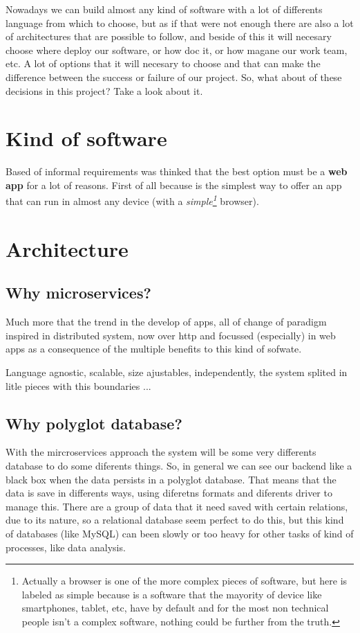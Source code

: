 \documentclass[oneside,english,titlepage]{scrbook}
\begin{document}
Nowadays we can build almost any kind of software with a lot of differents
language from which to choose, but as if that were not enough there
are also a lot of architectures that are possible to follow, and beside
of this it will necesary choose where deploy our software, or how
doc it, or how magane our work team, etc. A lot of options that it
will necesary to choose and that can make the difference between the
success or failure of our project. So, what about of these decisions
in this project? Take a look about it.

\section{Kind of software}
Based of informal requirements was thinked that the best option must be a \textbf{web app} for a lot of reasons. First of all because is the simplest way to offer an app that can run in almost any device (with a \textit{simple\footnote{Actually a browser is one of the more complex pieces of software, but here is labeled as simple because is a software that the mayority of device like smartphones, tablet, etc, have by default and for the most non technical people isn't a complex software, nothing could be further from the truth.}} browser). 

\section{Architecture}

\subsection{Why microservices?}

Much more that the trend in the develop of apps, all of change of
paradigm inspired in distributed system, now over http and focussed
(especially) in web apps as a consequence of the multiple benefits
to this kind of sofwate. \bigskip

Language agnostic, scalable, size ajustables, independently, the system
splited in litle pieces with this boundaries ...

\subsection{Why polyglot database?}

With the mircroservices approach the system will be some very differents
database to do some diferents things. So, in general we can see our
backend like a black box when the data persists in a polyglot database.
That means that the data is save in differents ways, using diferetns
formats and diferents driver to manage this. There are a group of
data that it need saved with certain relations, due to its nature,
so a relational database seem perfect to do this, but this kind of
databases (like MySQL) can been slowly or too heavy for other tasks
of kind of processes, like data analysis.
\end{document}
